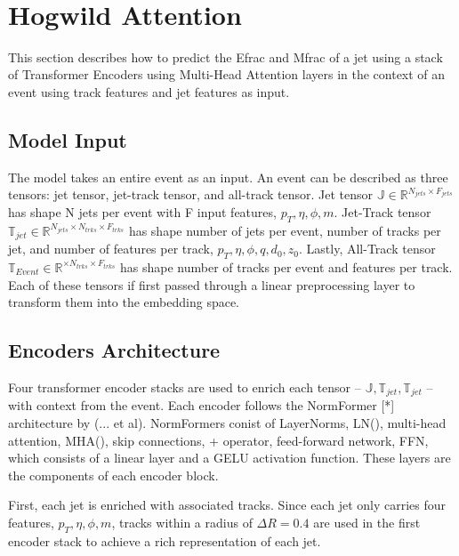 \hfill\\
\section{Hogwild Attention}\hfill

This section describes how to predict the Efrac and Mfrac of a jet using a stack of Transformer Encoders using Multi-Head Attention layers in the context of an event using track features and jet features as input.

\subsection{Model Input}\hfill

The model takes an entire event as an input. An event can be described as three tensors: jet tensor, jet-track tensor, and all-track tensor. Jet tensor $\mathbb{J}\in \mathbb{R}^{N_{jets} \times F_{jets}}$ has shape N jets per event with F input features, $p_T, \eta, \phi, m$. Jet-Track tensor $\mathbb{T}_{jet}\in \mathbb{R}^{N_{jets} \times N_{trks} \times F_{trks}}$ has shape number of jets per event, number of tracks per jet, and number of features per track, $p_T, \eta, \phi, q, d_0, z_0$. Lastly, All-Track tensor $\mathbb{T}_{Event}\in \mathbb{R}^{\times N_{trks} \times F_{trks}}$ has shape number of tracks per event and features per track. Each of these tensors if first passed through a linear preprocessing layer to transform them into the embedding space.

\subsection{Encoders Architecture}\hfill

Four transformer encoder stacks are used to enrich each tensor -- $\mathbb{J},\mathbb{T}_{jet},\mathbb{T}_{jet}$ -- with context from the event. Each encoder follows the NormFormer [*] architecture by (... et al). NormFormers conist of LayerNorms, LN(), multi-head attention, MHA(), skip connections, + operator, feed-forward network, FFN, which consists of a linear layer and a GELU activation function. These layers are the components of each encoder block.

First, each jet is enriched with associated tracks. Since each jet only carries four features, $p_T, \eta, \phi, m$, tracks within a radius of $\Delta R = 0.4$ are used in the first encoder stack to achieve a rich representation of each jet.

